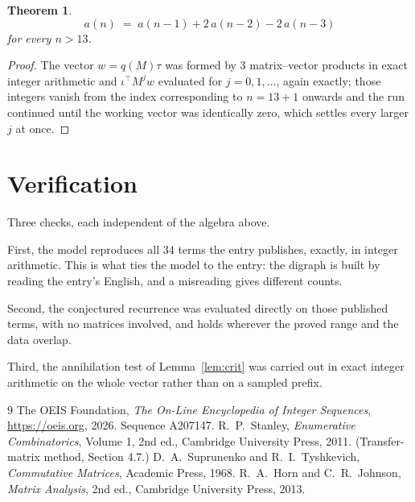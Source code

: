 \documentclass[11pt,a4paper]{article}
\theoremstyle{plain}
\newtheorem{theorem}{Theorem}
\theoremstyle{definition}
\begin{document}
\begin{theorem}
\[
a(n)\;=\;a(n-1) + 2\,a(n-2) - 2\,a(n-3)
\]
for every $n>13$.
\end{theorem}

\begin{proof}
The vector $w=q(M)\tau$ was formed by $3$ matrix--vector products in exact integer
arithmetic and $\iota^{\!\top}M^{j}w$ evaluated for $j=0,1,\dots$, again exactly; those
integers vanish from the index corresponding to $n=13+1$ onwards and the run continued
until the working vector was identically zero, which settles every larger $j$ at once.
\end{proof}

\section{Verification}

Three checks, each independent of the algebra above.

First, the model reproduces all $34$ terms the entry publishes, exactly, in integer
arithmetic. This is what ties the model to the entry: the digraph is built by reading the
entry's English, and a misreading gives different counts.

Second, the conjectured recurrence was evaluated directly on those published terms, with no
matrices involved, and holds wherever the proved range and the data overlap.

Third, the annihilation test of Lemma~\ref{lem:crit} was carried out in exact integer
arithmetic on the whole vector rather than on a sampled prefix.

\begin{thebibliography}{9}
 The OEIS Foundation, \emph{The On-Line Encyclopedia of Integer
Sequences}, \url{https://oeis.org}, 2026. Sequence A207147.
 R.~P.~Stanley, \emph{Enumerative Combinatorics}, Volume 1, 2nd ed.,
Cambridge University Press, 2011. (Transfer-matrix method, Section 4.7.)
 D.~A.~Suprunenko and R.~I.~Tyshkevich, \emph{Commutative Matrices},
Academic Press, 1968.
 R.~A.~Horn and C.~R.~Johnson, \emph{Matrix Analysis}, 2nd ed., Cambridge
University Press, 2013.
\end{thebibliography}
\end{document}
